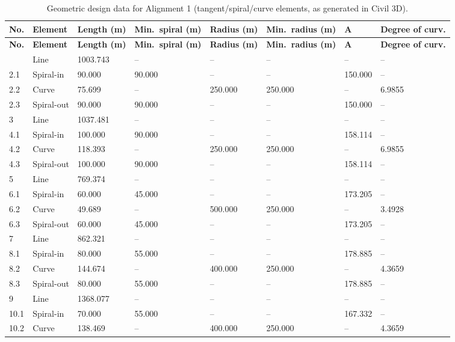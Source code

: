 \documentclass[11pt]{article}
\begin{document}
\begin{longtable}{p{0.9cm}p{1.6cm}p{1.5cm}p{1.7cm}p{1.4cm}p{1.5cm}p{1.4cm}p{1.6cm}}
\caption{Geometric design data for Alignment 1 (tangent/spiral/curve elements, as generated in Civil 3D).}
\label{tab:geomdata} \\
\toprule
\textbf{No.} & \textbf{Element} & \textbf{Length (m)} & \textbf{Min.\ spiral (m)} & \textbf{Radius (m)} & \textbf{Min.\ radius (m)} & \textbf{A} & \textbf{Degree of curv.} \\
\midrule
\endfirsthead
\toprule
\textbf{No.} & \textbf{Element} & \textbf{Length (m)} & \textbf{Min.\ spiral (m)} & \textbf{Radius (m)} & \textbf{Min.\ radius (m)} & \textbf{A} & \textbf{Degree of curv.} \\
\midrule
\endhead
\bottomrule
\endfoot
1 & Line & 1003.743 & -- & -- & -- & -- & -- \\
2.1 & Spiral-in & 90.000 & 90.000 & -- & -- & 150.000 & -- \\
2.2 & Curve & 75.699 & -- & 250.000 & 250.000 & -- & 6.9855 \\
2.3 & Spiral-out & 90.000 & 90.000 & -- & -- & 150.000 & -- \\
3 & Line & 1037.481 & -- & -- & -- & -- & -- \\
4.1 & Spiral-in & 100.000 & 90.000 & -- & -- & 158.114 & -- \\
4.2 & Curve & 118.393 & -- & 250.000 & 250.000 & -- & 6.9855 \\
4.3 & Spiral-out & 100.000 & 90.000 & -- & -- & 158.114 & -- \\
5 & Line & 769.374 & -- & -- & -- & -- & -- \\
6.1 & Spiral-in & 60.000 & 45.000 & -- & -- & 173.205 & -- \\
6.2 & Curve & 49.689 & -- & 500.000 & 250.000 & -- & 3.4928 \\
6.3 & Spiral-out & 60.000 & 45.000 & -- & -- & 173.205 & -- \\
7 & Line & 862.321 & -- & -- & -- & -- & -- \\
8.1 & Spiral-in & 80.000 & 55.000 & -- & -- & 178.885 & -- \\
8.2 & Curve & 144.674 & -- & 400.000 & 250.000 & -- & 4.3659 \\
8.3 & Spiral-out & 80.000 & 55.000 & -- & -- & 178.885 & -- \\
9 & Line & 1368.077 & -- & -- & -- & -- & -- \\
10.1 & Spiral-in & 70.000 & 55.000 & -- & -- & 167.332 & -- \\
10.2 & Curve & 138.469 & -- & 400.000 & 250.000 & -- & 4.3659 \\

\end{longtable}
\end{document}
